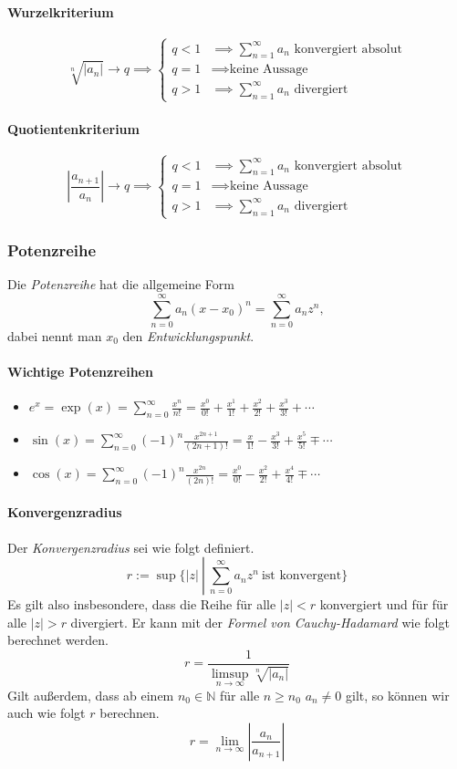 \documentclass[a4paper, 9pt, DIV=24]{scrartcl}
\newcommand{\N}{\mathbb{N}}
\begin{document}
\paragraph{Wurzelkriterium}
\[
  \sqrt[n]{\left | a_n \right |} \to q \implies
  \begin{cases}
    q < 1 & \implies \sum_{n=1}^\infty a_n \text{ konvergiert absolut}\\
    q = 1 & \implies \text{keine Aussage}\\
    q > 1 & \implies \sum_{n=1}^\infty a_n \text{ divergiert}
  \end{cases}
\]
\paragraph{Quotientenkriterium}
\[
\left| \frac{a_{n+1}}{a_n} \right| \to q \implies
\begin{cases}
  q < 1 & \implies \sum_{n=1}^\infty a_n \text{ konvergiert absolut} \\
  q = 1 & \implies \text{keine Aussage}\\
  q > 1 & \implies \sum_{n=1}^\infty a_n \text{ divergiert}
\end{cases}
\]

\subsubsection{Potenzreihe}
Die \emph{Potenzreihe} hat die allgemeine Form \[ \sum_{n=0}^\infty a_n (x - x_0)^n = \sum_{n=0}^\infty a_n z^n, \]
dabei nennt man $x_0$ den \emph{Entwicklungspunkt}.

\paragraph{Wichtige Potenzreihen}

\begin{itemize}
 \item $ e^x = \exp(x) = \sum_{n=0}^\infty \frac{x^n}{n!} = \frac{x^0}{0!} + \frac{x^1}{1!} + \frac{x^2}{2!} + \frac{x^3}{3!} + \cdots $
\item $ \sin (x) = \sum_{n=0}^\infty (-1)^n\frac{x^{2n+1}}{(2n+1)!} = \frac{x}{1!}-\frac{x^3}{3!}+\frac{x^5}{5!}\mp\cdots $
\item $ \cos (x) = \sum_{n=0}^\infty (-1)^n\frac{x^{2n}}{(2n)!} = \frac{x^0}{0!}-\frac{x^2}{2!}+\frac{x^4}{4!}\mp\cdots $
\end{itemize}


\paragraph{Konvergenzradius} Der \emph{Konvergenzradius} sei wie folgt definiert.
\[ r:=\sup \{ |z|\ \left|\ \sum_{n=0}^{\infty}a_n z^n\ \text{ist konvergent}\right.\}\]
Es gilt also insbesondere, dass die Reihe für alle $|z| < r$ konvergiert und für für alle $|z| > r$ divergiert.
Er kann mit der \emph{Formel von Cauchy-Hadamard} wie folgt berechnet werden.
\[ r = \frac{1}{\limsup_{n\to\infty} \sqrt[n]{|a_n|}} \]
Gilt außerdem, dass ab einem $n_0\in\N$ für alle $n \geq n_0$ $a_n \neq 0$ gilt, so können wir auch wie folgt $r$ berechnen.
\[ r = \lim_{n\to\infty} \left | \frac{a_n}{a_{n+1}} \right | \]
\end{document}
